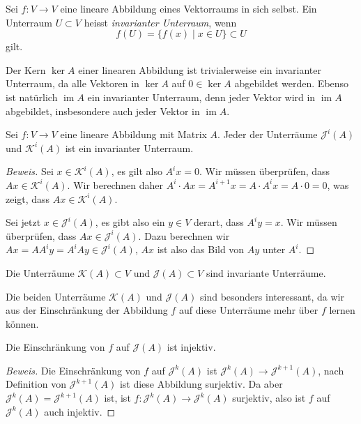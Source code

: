 \begin{definition}
\label{buch:eigenwerte:def:invarianter-unterraum}
Sei $f\colon V\to V$ eine lineare Abbildung eines Vektorraums in sich
selbst.
Ein Unterraum $U\subset V$ heisst {\em invarianter Unterraum},
wenn
\[
f(U) = \{ f(x)\;|\; x\in U\} \subset U
\]
gilt.
%
%
\end{definition}

Der Kern $\ker A$  einer linearen Abbildung ist trivialerweise ein
invarianter Unterraum, da alle Vektoren in $\ker A$ auf $0\in\ker A$
abgebildet werden.
Ebenso ist natürlich $\operatorname{im}A$ ein invarianter Unterraum,
denn jeder Vektor wird in $\operatorname{im}A$ abgebildet, insbesondere
auch jeder Vektor in $\operatorname{im}A$.

\begin{satz}
\label{buch:eigenwerte:satz:KJinvariant}
Sei $f\colon V\to V$ eine lineare Abbildung mit Matrix $A$.
Jeder der Unterräume $\mathcal{J}^i(A)$ und $\mathcal{K}^i(A)$ 
ist ein invarianter Unterraum.
\end{satz}

\begin{proof}[Beweis]
Sei $x\in\mathcal{K}^i(A)$, es gilt also $A^ix=0$.
Wir müssen überprüfen, dass $Ax\in\mathcal{K}^i(A)$.
Wir berechnen daher $A^i\cdot Ax=A^{i+1}x=A\cdot A^ix = A\cdot 0=0$,
was zeigt, dass $Ax\in\mathcal{K}^i(A)$.

Sei jetzt $x\in\mathcal{J}^i(A)$, es gibt also ein $y\in V$ derart, dass
$A^iy=x$.
Wir müssen überprüfen, dass $Ax\in\mathcal{J}^i(A)$.
Dazu berechnen wir $Ax=AA^iy=A^iAy\in\mathcal{J}^i(A)$, $Ax$ ist also das
Bild von $Ay$ unter $A^i$.
\end{proof}

\begin{korollar}
Die Unterräume $\mathcal{K}(A)\subset V$ und $\mathcal{J}(A)\subset V$
sind invariante Unterräume.
\end{korollar}

Die beiden Unterräume $\mathcal{K}(A)$ und $\mathcal{J}(A)$ sind besonders
interessant, da wir aus der Einschränkung der Abbildung $f$ auf diese
Unterräume mehr über $f$ lernen können.

\begin{satz}
\label{buch:eigenwerte:satz:fJinj}
Die Einschränkung von $f$ auf $\mathcal{J}(A)$ ist injektiv.
\end{satz}

\begin{proof}[Beweis]
Die Einschränkung von $f$ auf $\mathcal{J}^k(A)$ ist
$\mathcal{J}^k(A) \to \mathcal{J}^{k+1}(A)$, nach Definition von
$\mathcal{J}^{k+1}(A)$ ist diese Abbildung surjektiv.
Da aber $\mathcal{J}^k(A)=\mathcal{J}^{k+1}(A)$ ist, ist
$f\colon \mathcal{J}^k(A)\to\mathcal{J}^k(A)$ surjektiv,
also ist $f$ auf $\mathcal{J}^k(A)$ auch injektiv.
\end{proof}

